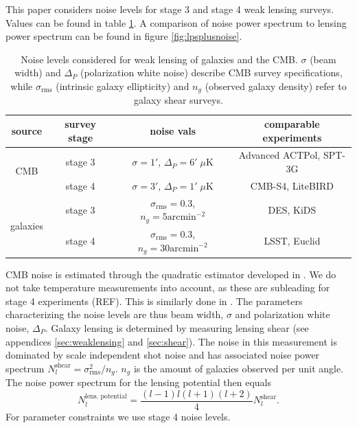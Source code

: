 \documentclass[11pt]{article} %
\begin{document}



This paper considers noise levels for stage 3 and stage 4 weak lensing surveys. Values can be found in table \ref{tab:noiselevels}. A comparison of noise power spectrum to lensing power spectrum can be found in figure \ref{fig:lpsplusnoise}. 

\begin{table}[h]
    \centering
    \begin{tabular}{|c|c|c|c|}
    \hline
    \textbf{source} & \textbf{survey stage} & \textbf{noise vals} & \textbf{comparable experiments} \\
    \hline 
    \multirow{2}{*}{CMB} 
        & stage 3 & $\sigma = 1'$, $\Delta_P = 6' \; \mu \text{K}$ & Advanced ACTPol, SPT-3G \\
    \cline{2-4}
        & stage 4 & $\sigma = 3'$, $\Delta_P = 1' \; \mu \text{K}$ & CMB-S4, LiteBIRD \\
    \hline
    \multirow{2}{*}{galaxies} 
        & stage 3 & $\sigma_{\text{rms}} = 0.3$, $n_g = 5 \text{arcmin}^{-2}$ & DES, KiDS \\
    \cline{2-4}
        & stage 4 & $\sigma_{\text{rms}} = 0.3$, $n_g = 30 \text{arcmin}^{-2}$ & LSST, Euclid \\
    \hline
    \end{tabular}
    \caption{Noise levels considered for weak lensing of galaxies and the CMB. $\sigma$ (beam width) and $\Delta_P$ (polarization white noise) describe CMB survey specifications, while $\sigma_{\text{rms}}$ (intrinsic galaxy ellipticity) and $n_g$ (observed galaxy density) refer to galaxy shear surveys.}
    \label{tab:noiselevels}
\end{table}

CMB noise is estimated through the quadratic estimator developed in \cite{cmblensingestimator}. We do not take temperature measurements into account, as these are subleading for stage 4 experiments (REF). This is similarly done in \cite{Namikawa_2016}. The parameters characterizing the noise levels are thus beam width, $\sigma$ and polarization white noise, $\Delta_P$. Galaxy lensing is determined by measuring lensing shear (see appendices \ref{sec:weaklensing} and \ref{sec:shear}). The noise in this measurement is dominated by scale independent shot noise and has associated noise power spectrum $N_l^{\text{shear}} = \sigma_{\text{rms}}^2 / n_g$. $n_g$ is the amount of galaxies observed per unit angle. The noise power spectrum for the lensing potential then equals
\begin{equation*}
    N_l^{\text{lens. potential}} = \frac{(l-1)l(l+1)(l+2)}{4}N_l^{\text{shear}}.
\end{equation*}
For parameter constraints we use stage 4 noise levels.
\end{document}
